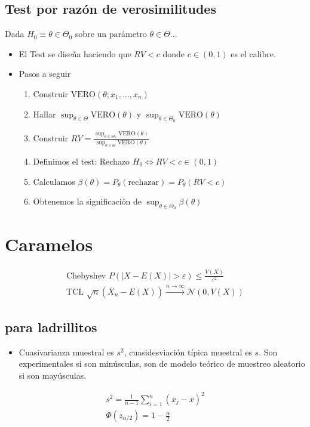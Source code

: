 \documentclass[a4paper,twocolumn]{extarticle}
\theoremstyle{remark}
\newcommand{\Xbarra}{\overline{X}}
\newcommand{\xbarra}{\overline{x}}
\newcommand{\normal}{\mathcal{N}}
\newcommand{\vero}{\text{VERO}}
\begin{document}
\subsection{Test por razón de verosimilitudes}

Dada $H_0 \equiv \theta \in \Theta_0$ sobre un parámetro $\theta \in \Theta$...

\begin{itemize}
	\item El Test se diseña haciendo que $RV < c$ donde $c \in (0,1)$ es el calibre.
	\item Pasos a seguir
	\begin{enumerate}
		\item Construir $\vero (\theta; x_1,\dots, x_n)$
		\item Hallar $\sup_{\theta \in \Theta} \vero(\theta)$ y $\sup_{\theta \in \Theta_0} \vero(\theta) $
		\item Construir $RV = \frac{\sup_{\theta \in \Theta_0} \vero(\theta)}{\sup_{\theta \in \Theta} \vero(\theta)}$
		\item Definimos el test: Rechazo $H_0 \iff RV < c \in (0,1)$
		\item Calculamos $\beta(\theta) = P_\theta(\text{rechazar}) = P_\theta(RV < c)$
		\item Obtenemos la significación de $\sup_{\theta \in \Theta_0} \beta (\theta)$
	\end{enumerate}
\end{itemize}

\section{Caramelos}


\begin{align*}
\text{Chebyshev }P(|X - E(X)| > \varepsilon) \leq \frac{V(X)}{\varepsilon^2} \\
\text{TCL }\sqrt{n}(\Xbarra_n - E(X)) \xrightarrow{n \to \infty} \normal(0, V(X))
\end{align*}

\subsection{para ladrillitos}
\begin{itemize}
	\item Cuasivarianza muestral es $s^2$, cuasidesviación típica muestral es $s$. Son experimentales si son minúsculas, son de modelo teórico de muestreo aleatorio si son mayúsculas.
\end{itemize}
\begin{align*}
	s^2 = \frac{1}{n-1}\sum_{i=1}^{n}(x_j - \xbarra)^2\\
	\Phi(z_{\alpha/2}) = 1 - \frac{\alpha}{2}
\end{align*}
\end{document}
